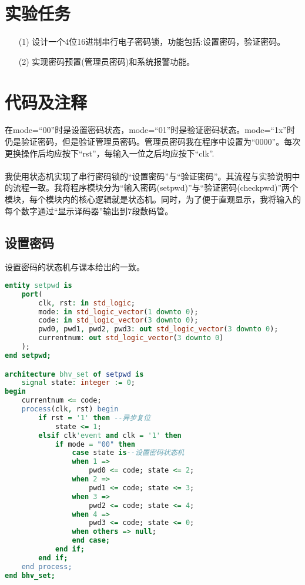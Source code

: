 \documentclass[UTF8, onecolumn, a4paper]{article}
\begin{document}
\section{实验任务}
\begin{enumerate}
	\item[(1)] 设计一个4位16进制串行电子密码锁，功能包括:设置密码，验证密码。
	\item[(2)] 实现密码预置(管理员密码)和系统报警功能。
\end{enumerate}
	
\section{代码及注释}
在mode=“00”时是设置密码状态，mode=“01”时是验证密码状态。mode=“1x”时仍是验证密码，但是验证管理员密码。管理员密码我在程序中设置为“0000”。每次更换操作后均应按下“rst”，每输入一位之后均应按下“clk”.
\paragraph*{}
我使用状态机实现了串行密码锁的“设置密码”与“验证密码”。其流程与实验说明中的流程一致。我将程序模块分为“输入密码(setpwd)”与“验证密码(checkpwd)”两个模块，每个模块内的核心逻辑就是状态机。同时，为了便于直观显示，我将输入的每个数字通过“显示译码器”输出到7段数码管。
\subsection{设置密码}
设置密码的状态机与课本给出的一致。

\begin{lstlisting}[language={VHDL}, title={setpwd.vhd}]
entity setpwd is
	port(
		clk, rst: in std_logic;
		mode: in std_logic_vector(1 downto 0);
		code: in std_logic_vector(3 downto 0);
		pwd0, pwd1, pwd2, pwd3: out std_logic_vector(3 downto 0);
		currentnum: out std_logic_vector(3 downto 0)
	);
end setpwd;

architecture bhv_set of setpwd is
	signal state: integer := 0;
begin
	currentnum <= code;
	process(clk, rst) begin
		if rst = '1' then --异步复位
			state <= 1;
		elsif clk'event and clk = '1' then
			if mode = "00" then
				case state is--设置密码状态机
				when 1 =>
					pwd0 <= code; state <= 2;
				when 2 =>
					pwd1 <= code; state <= 3;
				when 3 =>
					pwd2 <= code; state <= 4;
				when 4 =>
					pwd3 <= code; state <= 0;
				when others => null;
				end case;
			end if;
		end if;
	end process;
end bhv_set;
\end{lstlisting}
\end{document}
